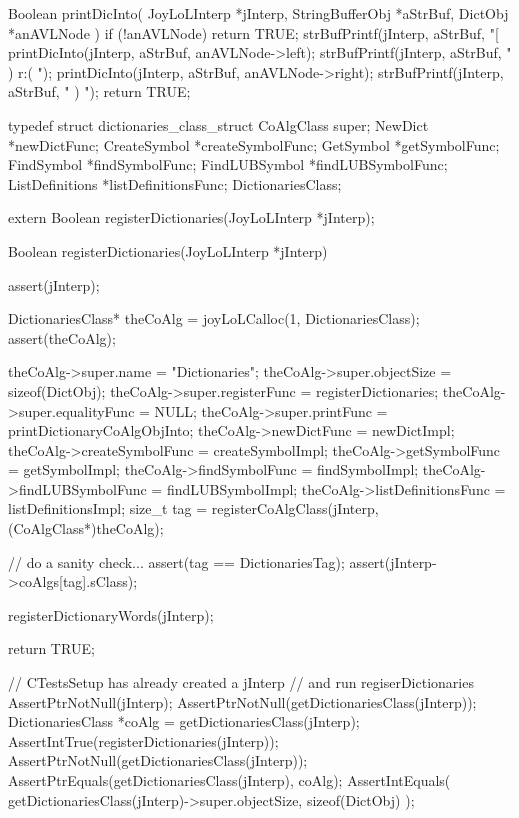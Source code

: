 Boolean printDicInto(
  JoyLoLInterp    *jInterp,
  StringBufferObj *aStrBuf,
  DictObj         *anAVLNode
) {
  if (!anAVLNode) return TRUE;
  strBufPrintf(jInterp, aStrBuf, "[%
  printDicInto(jInterp, aStrBuf, anAVLNode->left);
  strBufPrintf(jInterp, aStrBuf, " ) r:( ");
  printDicInto(jInterp, aStrBuf, anAVLNode->right);
  strBufPrintf(jInterp, aStrBuf, " ) ");
  return TRUE;
}
\stopCCode

\startTestSuite[registerDictionaries]

\startCHeader
typedef struct dictionaries_class_struct {
  CoAlgClass super;
  NewDict         *newDictFunc;
  CreateSymbol    *createSymbolFunc;
  GetSymbol       *getSymbolFunc;
  FindSymbol      *findSymbolFunc;
  FindLUBSymbol   *findLUBSymbolFunc;
  ListDefinitions *listDefinitionsFunc;
} DictionariesClass;
\stopCHeader

\startCHeader
extern Boolean registerDictionaries(JoyLoLInterp *jInterp);
\stopCHeader
{}

\startCCode
Boolean registerDictionaries(JoyLoLInterp *jInterp) {
  assert(jInterp);
  
  DictionariesClass* theCoAlg =
    joyLoLCalloc(1, DictionariesClass);
  assert(theCoAlg);
  
  theCoAlg->super.name          = "Dictionaries";
  theCoAlg->super.objectSize    = sizeof(DictObj);
  theCoAlg->super.registerFunc  = registerDictionaries;
  theCoAlg->super.equalityFunc  = NULL;
  theCoAlg->super.printFunc     = printDictionaryCoAlgObjInto;
  theCoAlg->newDictFunc         = newDictImpl;
  theCoAlg->createSymbolFunc    = createSymbolImpl;
  theCoAlg->getSymbolFunc       = getSymbolImpl;
  theCoAlg->findSymbolFunc      = findSymbolImpl;
  theCoAlg->findLUBSymbolFunc   = findLUBSymbolImpl;
  theCoAlg->listDefinitionsFunc = listDefinitionsImpl;
  size_t tag =
    registerCoAlgClass(jInterp, (CoAlgClass*)theCoAlg);
  
  // do a sanity check...
  assert(tag == DictionariesTag);
  assert(jInterp->coAlgs[tag].sClass);
  
  registerDictionaryWords(jInterp);
  
  return TRUE;
}
\stopCCode


\startCTest
  // CTestsSetup has already created a jInterp
  // and run regiserDictionaries
  AssertPtrNotNull(jInterp);
  AssertPtrNotNull(getDictionariesClass(jInterp));
  DictionariesClass *coAlg =
    getDictionariesClass(jInterp);
  AssertIntTrue(registerDictionaries(jInterp));
  AssertPtrNotNull(getDictionariesClass(jInterp));
  AssertPtrEquals(getDictionariesClass(jInterp), coAlg);
  AssertIntEquals(
    getDictionariesClass(jInterp)->super.objectSize, 
    sizeof(DictObj)
  );
\stopCTest
\stopTestCase
\stopTestSuite

